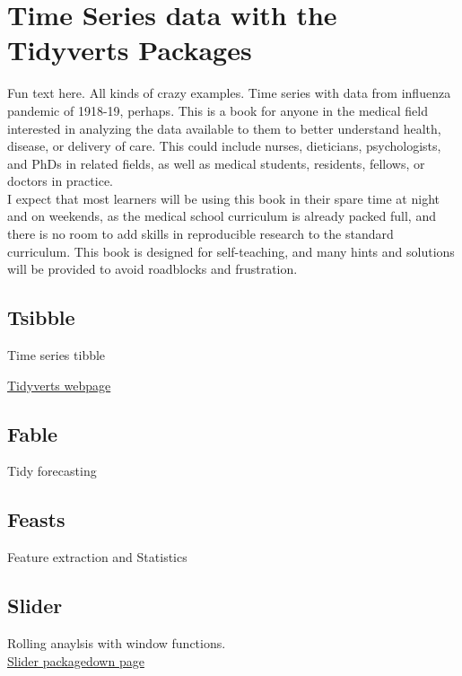 \documentclass[
]{book}
\begin{document}
\hypertarget{time-series-data-with-the-tidyverts-packages}{%
\chapter{Time Series data with the Tidyverts Packages}\label{time-series-data-with-the-tidyverts-packages}}

Fun text here.
All kinds of crazy examples.
Time series with data from influenza pandemic of 1918-19, perhaps.
This is a book for anyone in the medical field interested in analyzing the data available to them to better understand health, disease, or delivery of care. This could include nurses, dieticians, psychologists, and PhDs in related fields, as well as medical students, residents, fellows, or doctors in practice.\\
I expect that most learners will be using this book in their spare time at night and on weekends, as the medical school curriculum is already packed full, and there is no room to add skills in reproducible research to the standard curriculum. This book is designed for self-teaching, and many hints and solutions will be provided to avoid roadblocks and frustration.

\hypertarget{tsibble}{%
\section{Tsibble}\label{tsibble}}

Time series tibble

\href{https://tidyverts.org}{Tidyverts webpage}

\hypertarget{fable}{%
\section{Fable}\label{fable}}

Tidy forecasting

\hypertarget{feasts}{%
\section{Feasts}\label{feasts}}

Feature extraction and Statistics

\hypertarget{slider}{%
\section{Slider}\label{slider}}

Rolling anaylsis with window functions.\\
\href{https://davisvaughan.github.io/slider/}{Slider packagedown page}
\end{document}
